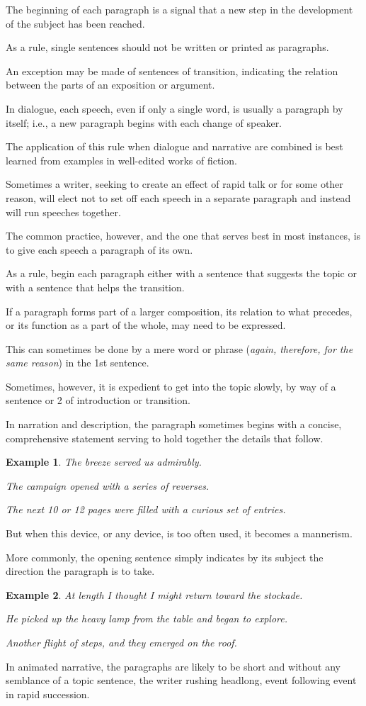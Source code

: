 \documentclass{book}
\numberwithin{equation}{section}
\newtheorem{example}{Example}[chapter]
\begin{document}
The beginning of each paragraph is a signal that a new step in the development of the subject has been reached.

%
As a rule, single sentences should not be written or printed as paragraphs.

An exception may be made of sentences of transition, indicating the relation between the parts of an exposition or argument.

%
In dialogue, each speech, even if only a single word, is usually a paragraph by itself; i.e., a new paragraph begins with each change of speaker.

The application of this rule when dialogue and narrative are combined is best learned from examples in well-edited works of fiction.

Sometimes a writer, seeking to create an effect of rapid talk or for some other reason, will elect not to set off each speech in a separate paragraph and instead will run speeches together.

The common practice, however, and the one that serves best in most instances, is to give each speech a paragraph of its own.

%
As a rule, begin each paragraph either with a sentence that suggests the topic or with a sentence that helps the transition.

If a paragraph forms part of a larger composition, its relation to what precedes, or its function as a part of the whole, may need to be expressed.

This can sometimes be done by a mere word or phrase (\textit{again, therefore, for the same reason}) in the 1st sentence.

Sometimes, however, it is expedient to get into the topic slowly, by way of a sentence or 2 of introduction or transition.

%
In narration and description, the paragraph sometimes begins with a concise, comprehensive statement serving to hold together the details that follow.
\begin{example}
    The breeze served us admirably.
    
    The campaign opened with a series of reverses.
    
    The next 10 or 12 pages were filled with a curious set of entries.
\end{example}
But when this device, or any device, is too often used, it becomes a mannerism.

More commonly, the opening sentence simply indicates by its subject the direction the paragraph is to take.
\begin{example}
    At length I thought I might return toward the stockade.
    
    He picked up the heavy lamp from the table and began to explore.
    
    Another flight of steps, and they emerged on the roof.
\end{example}
In animated narrative, the paragraphs are likely to be short and without any semblance of a topic sentence, the writer rushing headlong, event following event in rapid succession.
\end{document}
